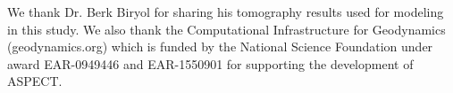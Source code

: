 \documentclass[draft,linenumbers]{agujournal2018}
\begin{document}

\acknowledgments
We thank Dr. Berk Biryol for sharing his tomography results used for modeling in this study. We also thank the Computational Infrastructure for Geodynamics (geodynamics.org) which is funded by the National Science Foundation under award EAR-0949446 and EAR-1550901 for supporting the development of ASPECT.



%

%





\end{document}

